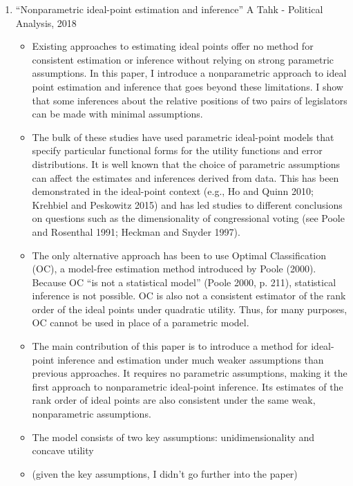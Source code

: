 \documentclass[a4paper,12pt]{article}
\begin{document}
\begin{enumerate}
\item “Nonparametric ideal-point estimation and inference” A Tahk - Political Analysis, 2018 
\begin{itemize}
\item Existing approaches to estimating ideal points offer no method for consistent estimation or inference without relying on strong parametric assumptions. In this paper, I introduce a nonparametric approach to ideal point estimation and inference that goes beyond these limitations. I show that some inferences about the relative positions of two pairs of legislators can be made with minimal assumptions.  
\item The bulk of these studies have used parametric ideal-point models that specify particular functional forms for the utility functions and error distributions. It is well known that the choice of parametric assumptions can affect the estimates and inferences derived from data. This has been demonstrated in the ideal-point context (e.g., Ho and Quinn 2010; Krehbiel and Peskowitz 2015) and has led studies to different conclusions on questions such as the dimensionality of congressional voting (see Poole and Rosenthal 1991; Heckman and Snyder 1997). 
\item The only alternative approach has been to use Optimal Classification (OC), a model-free estimation method introduced by Poole (2000). Because OC “is not a statistical model” (Poole 2000, p. 211), statistical inference is not possible. OC is also not a consistent estimator of the rank order of the ideal points under quadratic utility. Thus, for many purposes, OC cannot be used in place of a parametric model. 
\item The main contribution of this paper is to introduce a method for ideal-point inference and estimation under much weaker assumptions than previous approaches. It requires no parametric assumptions, making it the first approach to nonparametric ideal-point inference. Its estimates of the rank order of ideal points are also consistent under the same weak, nonparametric assumptions. 
\item The model consists of two key assumptions: unidimensionality and concave utility 

\item (given the key assumptions, I didn’t go further into the paper) 

\end{itemize}



\newpage





\end{enumerate}
\end{document}
